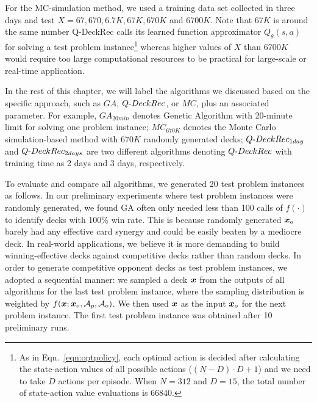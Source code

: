 For the MC-simulation method, we used a training data set collected in three days and test ${X=67, 670, 6.7K, 67K, 670K}$ and $6700K$. Note that $67K$ is around the same number Q-DeckRec calls its learned function approximator $Q_\theta(s,a)$ for solving a test problem instance\footnote{As in Eqn.~\ref{eqn:optpolicy}, each optimal action is decided after calculating the state-action values of all possible actions ($(N-D)\cdot D + 1$) and we need to take $D$ actions per episode. When $N=312$ and $D=15$, the total number of state-action value evaluations is 66840.} whereas higher values of $X$ than $6700K$ would require too large computational resources to be practical for large-scale or real-time application. 


In the rest of this chapter, we will label the algorithms we discussed based on the specific approach, such as $GA$, $Q\textnormal{-}DeckRec$, or $MC$, plus an associated parameter. For example, $GA_{20min}$ denotes Genetic Algorithm with 20-minute limit for solving one problem instance; $MC_{670K}$ denotes the Monte Carlo simulation-based method with $670K$ randomly generated decks; $Q\textnormal{-}DeckRec_{1day}$ and $Q\textnormal{-}DeckRec_{2days}$ are two different algorithms denoting $Q\textnormal{-}DeckRec$ with training time as 2 days and 3 days, respectively.   

To evaluate and compare all algorithms, we generated 20 test problem instances as follows. In our preliminary experiments where test problem instances were randomly generated, we found GA often only needed less than 100 calls of $f(\cdot)$ to identify decks with 100\% win rate. This is because randomly generated $\boldsymbol{x}_o$ barely had any effective card synergy and could be easily beaten by a mediocre deck. In real-world applications, we believe it is more demanding to build winning-effective decks against competitive decks rather than random decks. In order to generate competitive opponent decks as test problem instances, we adopted a sequential manner: we sampled a deck $\boldsymbol{x}$ from the outputs of all algorithms for the last test problem instance, where the sampling distribution is weighted by $f(\boldsymbol{x};\boldsymbol{x}_o, \mathcal{A}_p, \mathcal{A}_o)$. We then used $\boldsymbol{x}$ as the input $\boldsymbol{x}_o$ for the next problem instance. The first test problem instance was obtained after 10 preliminary runs. 

